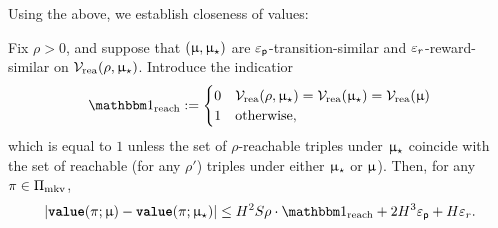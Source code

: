 \newcommand{\indreach}{\ind_{\mathrm{reach}}}
Using the above, we establish closeness of values:
\begin{lemma}\label{lem:reachable_simulation} Fix $\rho > 0$, and suppose that  $(\upmu,\upmu_{\star})$ are  $\varepsilon_{\mathsf{p}}$-transition-similar and $\varepsilon_{r}$-reward-similar on $\mathcal{V}_{\mathrm{rea}}(\rho,\upmu_{\star})$. Introduce the indicatior
\begin{align*}
\indreach :=\begin{cases}0 & \Vreach(\rho,\modst) = \Vreach(\modst) = \Vreach(\model)\\
1 & \text{otherwise},
\end{cases}
\end{align*}
which is equal to $1$ unless the set of $\rho$-reachable triples under $\upmu_{\star}$ coincide with the set of reachable (for any $\rho'$) triples under either $\upmu_{\star}$ or $\upmu$).  Then, for any $\pi \in \Pi_{\mathrm{mkv}}$,
\begin{align}
\left|\valuef{\pi}{\model} - \valuef{\pi}{\modst}\right| \le  H^2 S \rho \cdot\indreach  + 2 H^3 \epsp + H\epsr. \label{eq:first_bound_reach}
\end{align}
\end{lemma}
